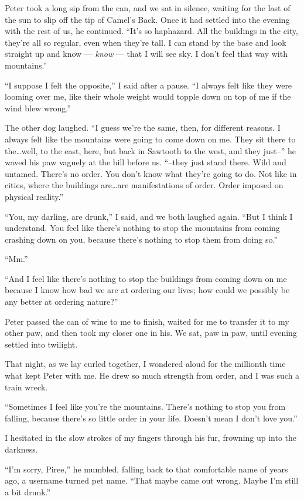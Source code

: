 Peter took a long sip from the can, and we sat in silence, waiting for the last of the sun to slip off the tip of Camel's Back. Once it had settled into the evening with the rest of us, he continued. ``It's so haphazard. All the buildings in the city, they're all so regular, even when they're tall. I can stand by the base and look straight up and know --- \emph{know} --- that I will see sky. I don't feel that way with mountains.''

``I suppose I felt the opposite,'' I said after a pause. ``I always felt like they were looming over me, like their whole weight would topple down on top of me if the wind blew wrong.''

The other dog laughed. ``I guess we're the same, then, for different reasons. I always felt like the mountains were going to come down on me. They sit there to the\ldots{}well, to the east, here, but back in Sawtooth to the west, and they just--'' he waved his paw vaguely at the hill before us. ``--they just stand there. Wild and untamed. There's no order. You don't know what they're going to do. Not like in cities, where the buildings are\ldots{}are manifestations of order. Order imposed on physical reality.''

``You, my darling, are drunk,'' I said, and we both laughed again. ``But I think I understand. You feel like there's nothing to stop the mountains from coming crashing down on you, because there's nothing to stop them from doing so.''

``Mm.''

``And I feel like there's nothing to stop the buildings from coming down on me because I know how bad we are at ordering our lives; how could we possibly be any better at ordering nature?''

Peter passed the can of wine to me to finish, waited for me to transfer it to my other paw, and then took my closer one in his. We sat, paw in paw, until evening settled into twilight.

That night, as we lay curled together, I wondered aloud for the millionth time what kept Peter with me. He drew so much strength from order, and I was such a train wreck.

``Sometimes I feel like you're the mountains. There's nothing to stop you from falling, because there's so little order in your life. Doesn't mean I don't love you.''

I hesitated in the slow strokes of my fingers through his fur, frowning up into the darkness.

``I'm sorry, Piree,'' he mumbled, falling back to that comfortable name of years ago, a username turned pet name. ``That maybe came out wrong. Maybe I'm still a bit drunk.''

